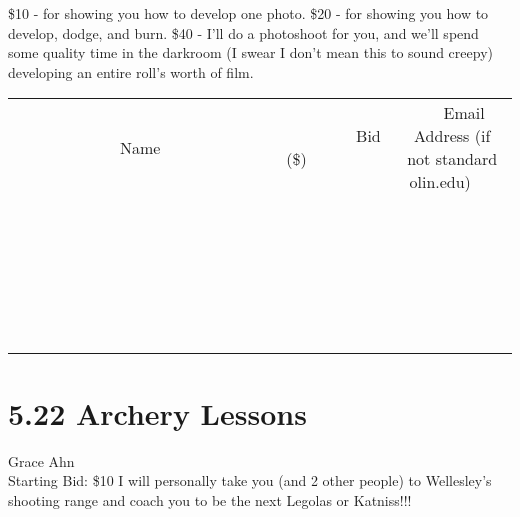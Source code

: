 \documentclass[11pt]{article}
\begin{document}
\$10 - for showing you how to develop one photo.
\$20 - for showing you how to develop, dodge, and burn.
\$40 - I'll do a photoshoot for you, and we'll spend some quality time in the darkroom (I swear I don't mean this to sound creepy) developing an entire roll's worth of film.
\\[6ex]
\begin{tabular}{c c c}
~~~~~~~~~~~~~Name~~~~~~~~~~~~~ & ~~~~~~~~~Bid (\$)~~~~~~~~~  & ~~~Email Address (if not standard olin.edu)~~~\\
 & & \\
\hline
 & & \\
\hline
 & & \\
\hline
 & & \\
\hline
 & & \\
\hline
 & & \\
\hline
 & & \\
\hline
 & & \\
\hline
 & & \\
\hline
 & & \\
\hline
 & & \\
\hline
 & & \\
\hline
 & & \\
\hline
 & & \\
\hline
 & & \\
\hline
 & & \\
\hline
 & & \\
\hline
 & & \\
\hline
 & & \\
\hline
 & & \\
\hline
 & & \\
\hline
 & & \\
\hline
 & & \\
\hline
 & & \\
\hline
 & & \\
\hline
 & & \\
\hline
\end{tabular}
\newpage
\section*{5.22 Archery Lessons}
Grace Ahn
\\
Starting Bid: \$10
\newline
I will personally take you (and 2 other people) to Wellesley's shooting range and coach you to be the next Legolas or Katniss!!! 
\end{document}
